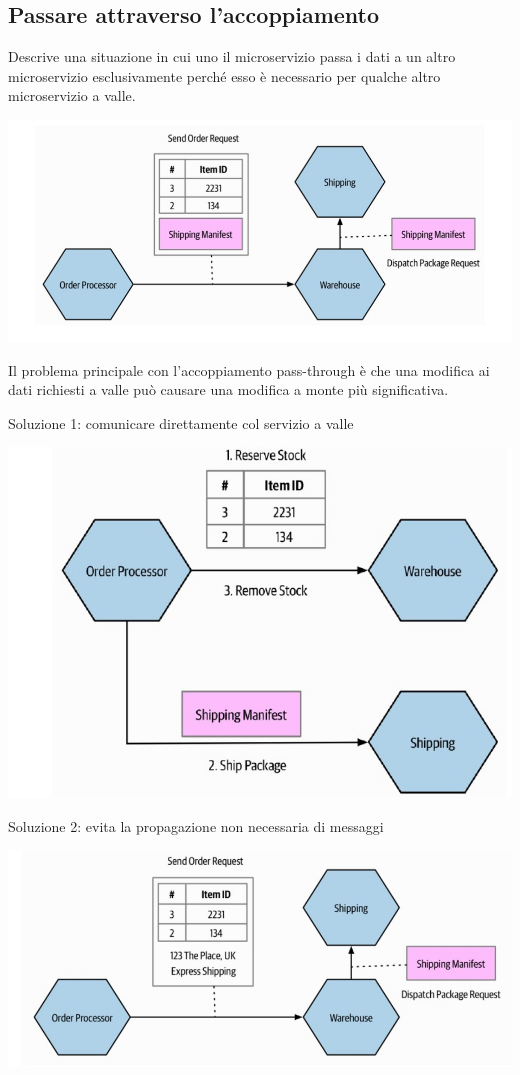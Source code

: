 \subsection{Passare attraverso l'accoppiamento}
Descrive una situazione in cui uno
il microservizio passa i dati a un altro microservizio esclusivamente perché esso
è necessario per qualche altro microservizio a valle.
\begin{center}
    \includegraphics[scale = 0.4]{Images/SOA/ModelMicroservices2.jpg}
\end{center}
Il problema principale con l'accoppiamento pass-through è che una modifica ai dati richiesti a valle può causare una modifica a monte più significativa.

Soluzione 1: comunicare direttamente col servizio a valle
\begin{center}
    \includegraphics[scale = 0.4]{Images/SOA/ModelMicroservices3.jpg}
\end{center}

Soluzione 2: evita la propagazione non necessaria di messaggi
\begin{center}
    \includegraphics[scale = 0.4]{Images/SOA/ModelMicroservices4.jpg}
\end{center}


